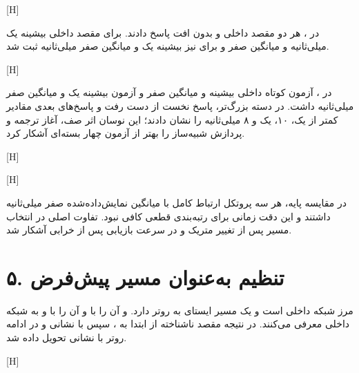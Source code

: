 [H]

در ، هر دو مقصد داخلی و  بدون افت پاسخ دادند. برای
مقصد داخلی بیشینه یک میلی‌ثانیه و میانگین صفر و برای  نیز بیشینه
یک و میانگین صفر میلی‌ثانیه ثبت شد.

[H]

در ، آزمون کوتاه داخلی بیشینه و میانگین صفر و آزمون 
بیشینه یک و میانگین صفر میلی‌ثانیه داشت. در دسته بزرگ‌تر، پاسخ نخست از دست رفت
و پاسخ‌های بعدی مقادیر کمتر از یک، ۱۰، یک و ۸ میلی‌ثانیه را نشان دادند؛ این
نوسان اثر صف، آغاز ترجمه و پردازش شبیه‌ساز را بهتر از آزمون چهار بسته‌ای
آشکار کرد.

[H]

[H]

در مقایسه پایه، هر سه پروتکل ارتباط کامل با میانگین نمایش‌داده‌شده صفر
میلی‌ثانیه داشتند و این دقت زمانی برای رتبه‌بندی قطعی کافی نبود. تفاوت اصلی در
انتخاب مسیر پس از تغییر متریک و در سرعت بازیابی پس از خرابی آشکار شد.

\section{۵. تنظیم  به‌عنوان مسیر پیش‌فرض}

 مرز شبکه داخلی است و یک مسیر ایستای  به روتر
 دارد.  و  آن را با
 و  آن را با
 و  به شبکه داخلی معرفی می‌کنند.
در نتیجه مقصد ناشناخته  از  ابتدا به ،
سپس  با نشانی  و در ادامه روتر  با
نشانی  تحویل داده شد.

[H]


